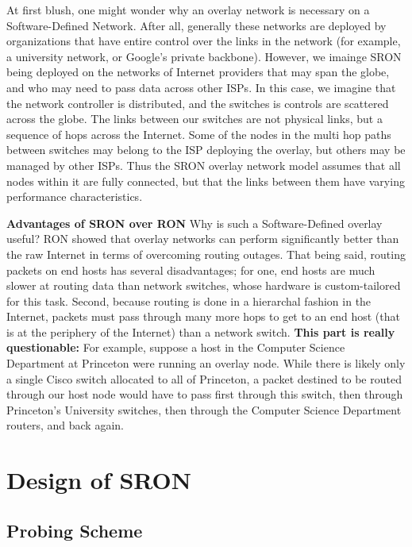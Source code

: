 \documentclass[pageno]{jpaper}
\begin{document}
At first blush, one might 
wonder why an overlay network is necessary on a Software-Defined Network. After all, generally
these networks are deployed by organizations that have entire control over the links in the 
network (for example, a university network, or Google's private backbone). However, we imainge
SRON being deployed on the networks of Internet providers that may span the globe, and who may
need to pass data across other ISPs. In this case, we imagine that the network controller is 
distributed, and the switches is controls are scattered across the globe. The links between 
our switches are not physical links, but a sequence of hops across the Internet. Some of the 
nodes in the multi hop paths between switches may belong to the ISP deploying the overlay, 
but others may be managed by other ISPs.  Thus the SRON overlay network model assumes that all
nodes within it are fully connected, but that the links between them have varying performance 
characteristics.\bigskip

{\bf Advantages of SRON over RON}
Why is such a Software-Defined overlay useful? RON\cite{ron} showed that overlay networks can 
perform significantly better than the raw Internet in terms of overcoming routing outages. That 
being said, routing packets on end hosts has several disadvantages; for one, end hosts are 
much slower at routing data than network switches, whose hardware is custom-tailored for this task.
Second, because routing is done in a hierarchal fashion in the Internet, packets must pass 
through many more hops to get to an end host (that is at the periphery of the Internet) than a 
network switch.
{\bf This part is really questionable:} 
For example, suppose a host in the Computer Science Department at Princeton 
were running an overlay node. While there is likely only a single Cisco switch allocated to all of 
Princeton, a packet destined to be routed through our host node would have to pass first through this 
switch, then through Princeton's University switches, then through the Computer Science Department
routers, and back again.


\section{Design of SRON}

\subsection{Probing Scheme}
\end{document}
